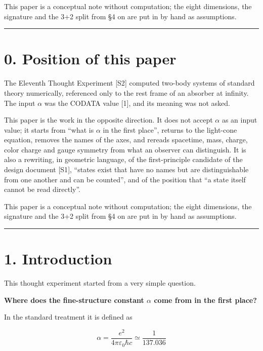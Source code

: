 \documentclass[
  a4paper,
]{article}
\begin{document}
This paper is a conceptual note without computation; the eight
dimensions, the signature and the 3+2 split from §4 on are put in by
hand as assumptions.

\begin{center}\rule{0.5\linewidth}{0.5pt}\end{center}

\section{0. Position of this paper}\label{position-of-this-paper}

The Eleventh Thought Experiment {[}S2{]} computed two-body systems of
standard theory numerically, referenced only to the rest frame of an
absorber at infinity. The input \(\alpha\) was the CODATA value {[}1{]},
and its meaning was not asked.

This paper is the work in the opposite direction. It does not accept
\(\alpha\) as an input value; it starts from ``what is \(\alpha\) in the
first place'', returns to the light-cone equation, removes the names of
the axes, and rereads spacetime, mass, charge, color charge and gauge
symmetry from what an observer can distinguish. It is also a rewriting,
in geometric language, of the first-principle candidate of the design
document {[}S1{]}, ``states exist that have no names but are
distinguishable from one another and can be counted'', and of the
position that ``a state itself cannot be read directly''.

This paper is a conceptual note without computation; the eight
dimensions, the signature and the 3+2 split from §4 on are put in by
hand as assumptions.

\begin{center}\rule{0.5\linewidth}{0.5pt}\end{center}

\section{1. Introduction}\label{introduction}

This thought experiment started from a very simple question.

\textbf{Where does the fine-structure constant \(\alpha\) come from in
the first place?}

In the standard treatment it is defined as

\[
\alpha=
\frac{e^2}{4\pi\varepsilon_0\hbar c}
\simeq\frac{1}{137.036}
\]
\end{document}
